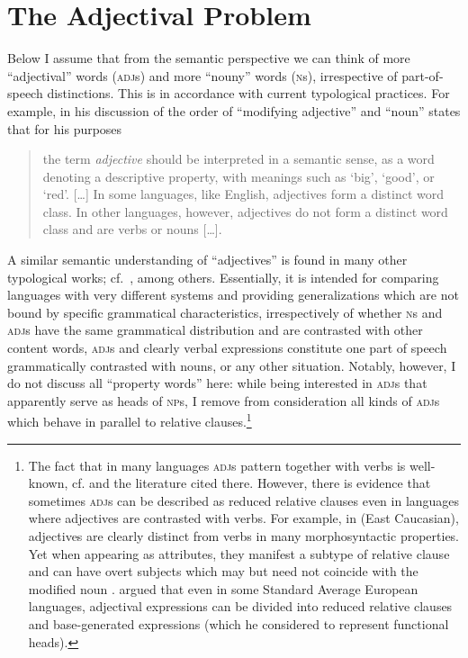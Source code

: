 \documentclass[output=paper
  ,nobabel
  ,draftmode
  ,colorlinks, citecolor=brown
]{langscibook}
\begin{document}
\section{The Adjectival Problem}\label{sec-adjprob}

Below I assume that from the semantic perspective we can think of more ``adjectival'' words (\textsc{adj}s) and more ``nouny'' words (\textsc{n}s), irrespective of part-of-speech distinctions. This is in accordance with current typological practices. For example, \citet{wals-87} in his discussion of the order of ``modifying adjective'' and ``noun'' states that for his purposes

\begin{quote}
    the term \emph{adjective} should be interpreted in a semantic sense, as a word denoting a
    descriptive property, with meanings such as `big', `good', or `red'. [\ldots] In some languages, like
    English, adjectives form a distinct word class. In other languages, however, adjectives do not
    form a distinct word class and are verbs or nouns [\ldots{}]. \citep{wals-87}
\end{quote}
A similar semantic understanding of ``adjectives'' is found in many other typological works; cf.\ \citet*[670]{Haspelmath2010}, \citet*[6]{Riessler2016} among others. 
Essentially, it is intended for comparing languages with very different systems and providing generalizations which are not bound by specific grammatical characteristics, irrespectively of whether \textsc{n}s and \textsc{adj}s have the same grammatical distribution and are contrasted with other content words, \textsc{adj}s and clearly verbal expressions constitute one part of speech grammatically contrasted with nouns, or any other situation. Notably, however, I do not discuss all ``property words'' here: while being interested in \textsc{adj}s that apparently serve as heads of \textsc{np}s, I remove from consideration all kinds of \textsc{adj}s which behave in parallel to relative clauses.\footnote{The fact that in many languages \textsc{adj}s pattern together with verbs is well-known, cf. \citet{Beck2002}  and the literature cited there. However, there is evidence that sometimes \textsc{adj}s can be described as reduced relative clauses even in languages where adjectives are contrasted with verbs. For example, in  (East Caucasian), adjectives are clearly distinct from verbs in many morphosyntactic properties. Yet when appearing as attributes, they manifest a subtype of relative clause and can have overt subjects which may but need not coincide with the modified noun \citep[198--199]{Sumbatova2014}. \citet{Cinque2010} argued that even in some Standard Average European languages, adjectival expressions can be divided into reduced relative clauses and base-generated expressions (which he considered to represent functional heads).}
\end{document}
